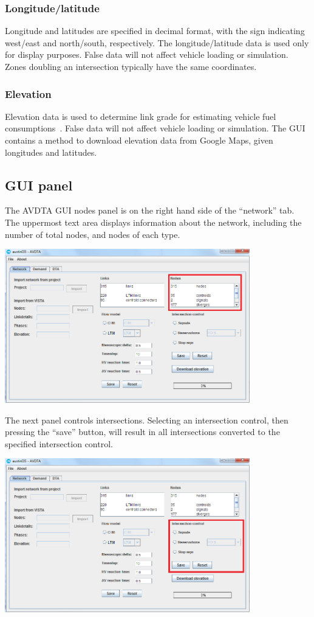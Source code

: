 \subsubsection*{Longitude/latitude}
Longitude and latitudes are specified in decimal format, with the sign indicating west/east and north/south, respectively. The longitude/latitude data is used only for display purposes. False data will not affect vehicle loading or simulation. Zones doubling an intersection typically have the same coordinates.

\subsubsection*{Elevation}
Elevation data is used to determine link grade for estimating vehicle fuel consumptions~\cite{levin2014effect}. False data will not affect vehicle loading or simulation. The GUI contains a method to download elevation data from Google Maps, given longitudes and latitudes.

\subsection{GUI panel}

The AVDTA GUI nodes panel is on the right hand side of the ``network'' tab. The uppermost text area displays information about the network, including the number of total nodes, and nodes of each type.
\begin{center}
\includegraphics[width=0.8\textwidth]{images/nodes1.png}
\end{center}

The next panel controls intersections. Selecting an intersection control, then pressing the ``save'' button, will result in all intersections converted to the specified intersection control.
\begin{center}
\includegraphics[width=0.8\textwidth]{images/nodes2.png}
\end{center}

